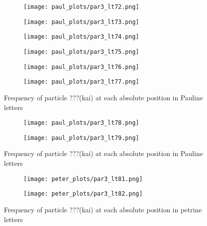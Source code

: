 \documentclass[a4paper]{article}
\begin{document}
\begin{figure}
\ContinuedFloat
\begin{subfigure}{0.45\textwidth}
\centering
\texttt{[image: paul\_plots/par3\_lt72.png]}
\end{subfigure}
\begin{subfigure}{0.45\textwidth}
\centering
\texttt{[image: paul\_plots/par3\_lt73.png]}
\end{subfigure}
\begin{subfigure}{0.45\textwidth}
\centering
\texttt{[image: paul\_plots/par3\_lt74.png]}
\end{subfigure}
\begin{subfigure}{0.45\textwidth}
\centering
\texttt{[image: paul\_plots/par3\_lt75.png]}
\end{subfigure}
\begin{subfigure}{0.45\textwidth}
\centering
\texttt{[image: paul\_plots/par3\_lt76.png]}
\end{subfigure}
\begin{subfigure}{0.45\textwidth}
\centering
\texttt{[image: paul\_plots/par3\_lt77.png]}
\end{subfigure}
\caption{Frequency of particle ???(kai) at each absolute position in Pauline letters}
\end{figure}

\begin{figure}
\ContinuedFloat
\begin{subfigure}{0.45\textwidth}
\centering
\texttt{[image: paul\_plots/par3\_lt78.png]}
\end{subfigure}
\begin{subfigure}{0.45\textwidth}
\centering
\texttt{[image: paul\_plots/par3\_lt79.png]}
\end{subfigure}
\caption{Frequency of particle ???(kai) at each absolute position in Pauline letters}
\end{figure}

\begin{figure}
\begin{subfigure}{0.45\textwidth}
\centering
\texttt{[image: peter\_plots/par3\_lt81.png]}
\end{subfigure}
\begin{subfigure}{0.45\textwidth}
\centering
\texttt{[image: peter\_plots/par3\_lt82.png]}
\end{subfigure}
\caption{Frequency of particle ???(kai) at each absolute position in petrine letters}
\label{peter_kai}
\end{figure}
\end{document}

